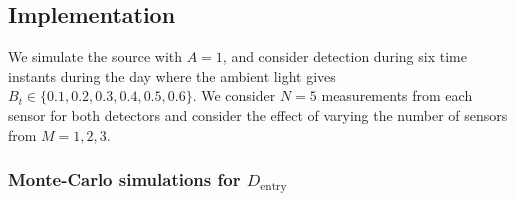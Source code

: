 \documentclass[11pt]{article}
\begin{document}

\subsection{Implementation}
\label{subsec:partA_implementation}

We simulate the source with $A=1$, and consider detection during six time instants during the day where the ambient light gives $B_{t} \in \{0.1, 0.2, 0.3, 0.4, 0.5, 0.6\}$. We consider $N=5$ measurements from each sensor for both detectors and consider the effect of varying the number of sensors from $M=1,2,3$.


\subsubsection{Monte-Carlo simulations for $D_{\text{entry}}$}
\label{subsubsec:entryDetector_working}
\end{document}
